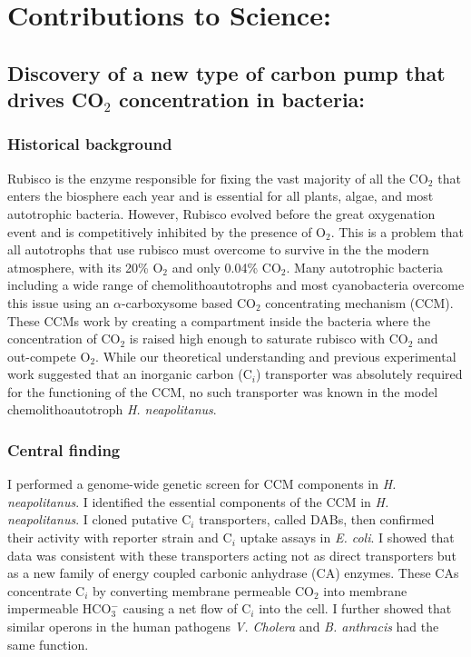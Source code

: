 \documentclass{article}
\begin{document}
\section*{Contributions to Science:}
\newrefsection
\subsection{Discovery of a new type of carbon pump that drives CO$_2$ concentration in bacteria:}
\subsubsection{Historical background}
Rubisco is the enzyme responsible for fixing the vast majority of all the CO$_2$ that enters the biosphere each year and is essential for all plants, algae, and most autotrophic bacteria. 
However, Rubisco evolved before the great oxygenation event and is competitively inhibited by the presence of O$_2$.
This is a problem that all autotrophs that use rubisco must overcome to survive in the the modern atmosphere, with its 20\% O$_2$ and only 0.04\% CO$_2$.
Many autotrophic bacteria including a wide range of chemolithoautotrophs and most cyanobacteria overcome this issue using an $\alpha$-carboxysome based CO$_2$ concentrating mechanism (CCM).
These CCMs work by creating a compartment inside the bacteria where the concentration of CO$_2$ is raised high enough to saturate rubisco with CO$_2$ and out-compete O$_2$.
While our theoretical understanding and previous experimental work suggested that an inorganic carbon (C$_i$) transporter was absolutely required for the functioning of the CCM, no such transporter was known in the model chemolithoautotroph \textit{H. neapolitanus}.
%
\subsubsection{Central finding}
I performed a genome-wide genetic screen for CCM components in \textit{H. neapolitanus}. 
I identified the essential components of the CCM in \textit{H. neapolitanus}.
I cloned putative C$_i$ transporters, called DABs, then confirmed their activity with reporter strain and C$_i$ uptake assays in \textit{E. coli}. 
I showed that data was consistent with these transporters acting not as direct transporters but as a new family of energy coupled carbonic anhydrase (CA) enzymes.
These CAs concentrate C$_i$ by converting membrane permeable CO$_2$ into membrane impermeable HCO$_{3}^{-}$ causing a net flow of C$_i$ into the cell.
I further showed that similar operons in the human pathogens \textit{V. Cholera} and \textit{B. anthracis} had the same function.
%
\end{document}
